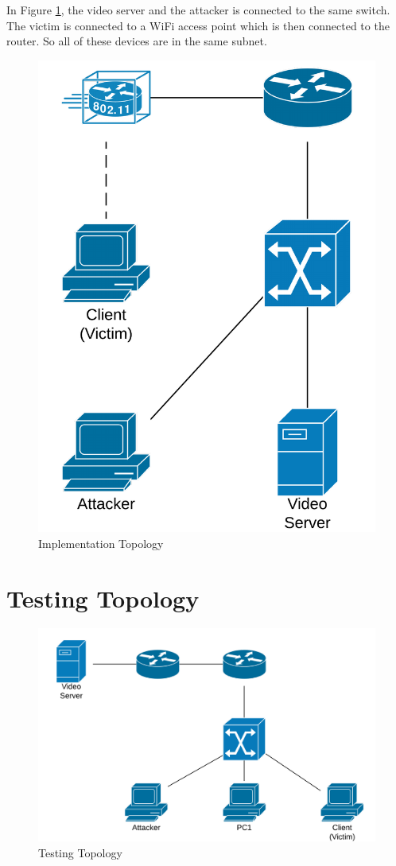 \documentclass[14pt]{extarticle}
\begin{document}
    In Figure \ref{fig:topolgy_implement}, the video server and the  attacker is connected to the same switch. The victim is connected to a WiFi access point which is then connected to the router. So all of these devices are in the same subnet.
    
    \begin{figure}
    \centering
        \includegraphics[width=.5\textwidth]{Pictures/Final_TCP_RST_Topology_Implementation.png}
        \caption{Implementation Topology}
        \label{fig:topolgy_implement}
    \end{figure}        
            
            
\section{Testing Topology}
    \label{sec:test_topology}
    \begin{figure}
        \centering
        \includegraphics[width=.95\textwidth]{Pictures/Final_TCP_RST_Topology_Test.png}
        \caption{Testing Topology}
        \label{fig:topology}
    \end{figure}
    
\end{document}
